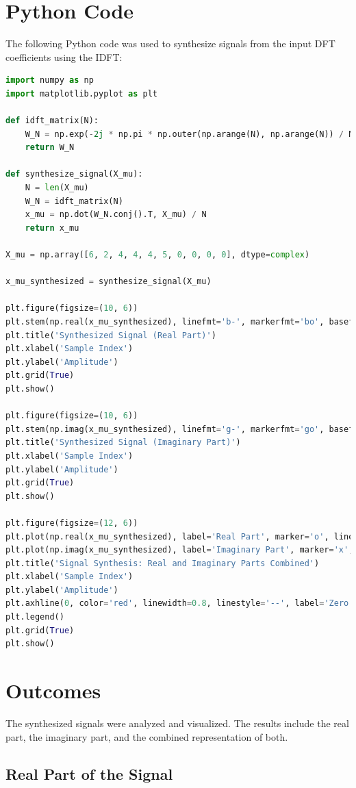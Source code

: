 \documentclass[12pt]{article}
\begin{document}
\section{Python Code}
The following Python code was used to synthesize signals from the input DFT coefficients using the IDFT:

\begin{lstlisting}[language=Python, breaklines=true]
import numpy as np
import matplotlib.pyplot as plt

def idft_matrix(N):
    W_N = np.exp(-2j * np.pi * np.outer(np.arange(N), np.arange(N)) / N)
    return W_N

def synthesize_signal(X_mu):
    N = len(X_mu)
    W_N = idft_matrix(N)
    x_mu = np.dot(W_N.conj().T, X_mu) / N
    return x_mu

X_mu = np.array([6, 2, 4, 4, 4, 5, 0, 0, 0, 0], dtype=complex)

x_mu_synthesized = synthesize_signal(X_mu)

plt.figure(figsize=(10, 6))
plt.stem(np.real(x_mu_synthesized), linefmt='b-', markerfmt='bo', basefmt='r-')
plt.title('Synthesized Signal (Real Part)')
plt.xlabel('Sample Index')
plt.ylabel('Amplitude')
plt.grid(True)
plt.show()

plt.figure(figsize=(10, 6))
plt.stem(np.imag(x_mu_synthesized), linefmt='g-', markerfmt='go', basefmt='r-')
plt.title('Synthesized Signal (Imaginary Part)')
plt.xlabel('Sample Index')
plt.ylabel('Amplitude')
plt.grid(True)
plt.show()

plt.figure(figsize=(12, 6))
plt.plot(np.real(x_mu_synthesized), label='Real Part', marker='o', linestyle='-', color='b')
plt.plot(np.imag(x_mu_synthesized), label='Imaginary Part', marker='x', linestyle='--', color='g')
plt.title('Signal Synthesis: Real and Imaginary Parts Combined')
plt.xlabel('Sample Index')
plt.ylabel('Amplitude')
plt.axhline(0, color='red', linewidth=0.8, linestyle='--', label='Zero Line')
plt.legend()
plt.grid(True)
plt.show()


\end{lstlisting}
\newpage
\section{Outcomes}
The synthesized signals were analyzed and visualized. The results include the real part, the imaginary part, and the combined representation of both.

\subsection{Real Part of the Signal}
\end{document}
